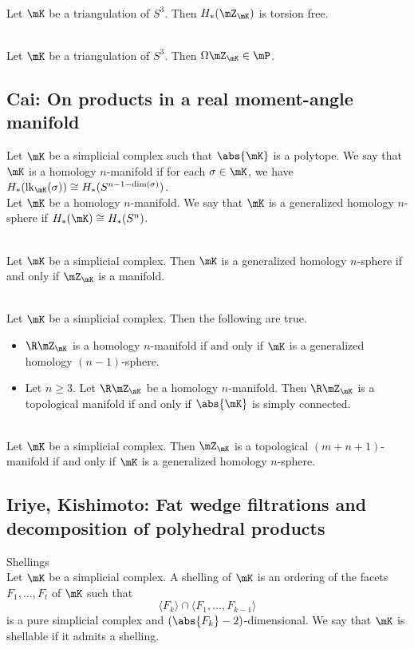 \documentclass[a4paper]{article}
\begin{document}
\begin{lmm}{}{}\\
Let $\mK$ be a triangulation of $S^3$. Then $H_\ast(\mZ_\mK)$ is torsion free. 
\end{lmm}

\begin{thm}{}{}\\
Let $\mK$ be a triangulation of $S^3$. Then $\Omega\mZ_\mK\in\mP$. 
\end{thm}

\subsection{Cai: On products in a real moment-angle manifold}
Let $\mK$ be a simplicial complex such that $\abs{\mK}$ is a polytope. We say that $\mK$ is a homology $n$-manifold if for each $\sigma\in\mK$, we have $H_\ast(\text{lk}_\mK(\sigma))\cong H_\ast(S^{n-1-\dim(\sigma)})$. \\

Let $\mK$ be a homology $n$-manifold. We say that $\mK$ is a generalized homology $n$-sphere if $H_\ast(\mK)\cong H_\ast(S^n)$. 

\begin{thm}{}{}\\
Let $\mK$ be a simplicial complex. Then $\mK$ is a generalized homology $n$-sphere if and only if $\mZ_\mK$ is a manifold. 
\end{thm}

\begin{thm}{}{}\\
Let $\mK$ be a simplicial complex. Then the following are true. 
\begin{itemize}
\item $\R\mZ_\mK$ is a homology $n$-manifold if and only if $\mK$ is a generalized homology $(n-1)$-sphere. 
\item Let $n\geq 3$. Let $\R\mZ_\mK$ be a homology $n$-manifold. Then $\R\mZ_\mK$ is a topological manifold if and only if $\abs{\mK}$ is simply connected. 
\end{itemize}
\end{thm}

\begin{thm}{}{}\\
Let $\mK$ be a simplicial complex. Then $\mZ_\mK$ is a topological $(m+n+1)$-manifold if and only if $\mK$ is a generalized homology $n$-sphere. 
\end{thm}

\subsection{Iriye, Kishimoto: Fat wedge filtrations and decomposition of polyhedral products}
\begin{defn}{Shellings}{}\\
Let $\mK$ be a simplicial complex. A shelling of $\mK$ is an ordering of the facets $F_1,\dots,F_t$ of $\mK$ such that $$\langle F_k\rangle\cap\langle F_1,\dots,F_{k-1}\rangle$$ is a pure simplicial complex and $(\abs{F_k}-2)$-dimensional. We say that $\mK$ is shellable if it admits a shelling. 
\end{defn}
\end{document}
